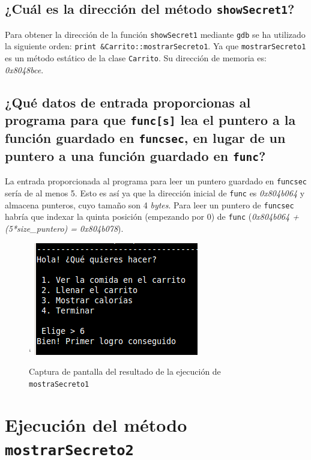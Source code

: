 \documentclass[10pt,a4paper]{article}
\begin{document}
\subsection{¿Cuál es la dirección del método \texttt{showSecret1}?}

Para obtener la dirección de la función \texttt{showSecret1} mediante \texttt{gdb} se ha utilizado la siguiente orden: \texttt{print \&{}Carrito::mostrarSecreto1}. Ya que \texttt{mostrarSecreto1} es un método estático de la clase \texttt{Carrito}. Su dirección de memoria es: \emph{0x8048bce}.


\subsection{¿Qué datos de entrada proporcionas al programa para que \texttt{func[s]} lea el puntero a la función guardado en \texttt{funcsec}, en lugar de un puntero a una función guardado en \texttt{func}?}

La entrada proporcionada al programa para leer un puntero guardado en \texttt{funcsec} sería de al menos 5. Esto es así ya que la dirección inicial de \texttt{func} es \emph{0x804b064} y almacena punteros, cuyo tamaño son 4 \emph{bytes}. Para leer un puntero de \texttt{funcsec} habría que indexar la quinta posición (empezando por 0) de \texttt{func} (\emph{0x804b064 + (5*size\_{}puntero) = 0x804b078}).\\

\begin{figure}[h!]`
\centering
\includegraphics[scale=0.8]{images/primer_logro.png}
\caption{Captura de pantalla del resultado de la ejecución de \texttt{mostraSecreto1}}
\label{fig:mostrarSecreto1}
\end{figure}


\newpage
\section{Ejecución del método \texttt{mostrarSecreto2}}
\end{document}
